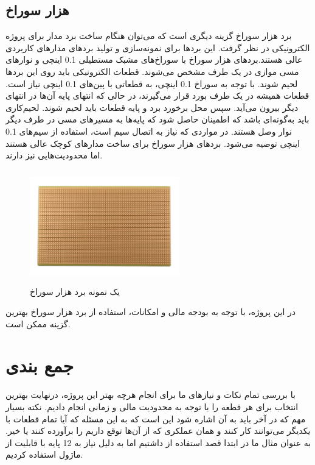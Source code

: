 \subsection{هزار سوراخ}

برد هزار سوراخ‌
\unskip{}
گزینه دیگری است که می‌توان هنگام ساخت برد مدار برای پروژه الکترونیکی در نظر گرفت. این بردها برای نمونه‌سازی و تولید بردهای مدارهای کاربردی عالی هستند.بردهای هزار سوراخ با سوراخ‌های مشبک مستطیلی 0.1 اینچی و نوارهای مسی موازی در یک طرف مشخص می‌شوند. قطعات الکترونیکی باید روی این بردها لحیم شوند. با توجه به سوراخ 0.1 اینچی، به قطعاتی با پین‌های 0.1  اینچی نیاز است. قطعات همیشه در یک طرف بورد قرار می‌گیرند، در حالی که انتهای پایه آ‌ن‌ها در انتهای دیگر بیرون می‌آید. سپس محل برخورد برد و پایه قطعات باید لحیم شوند. لحیم‌کاری باید به‌گونه‌ای باشد که اطمینان حاصل شود که پایه‌ها به مسیرهای مسی در طرف دیگر نوار وصل هستند. در مواردی که نیاز به اتصال سیم است، استفاده از سیم‌های 0.1 اینچی توصیه می‌شود. بردهای هزار سوراخ برای ساخت مدارهای کوچک عالی هستند اما محدودیت‌هایی نیز دارند.

    \begin{figure}[!h]
	\centering
	\includegraphics[height=4.9cm,width=6.5cm]{./Images/CH3/Stripboard.jpg}
	\caption{یک نمونه برد هزار سوراخ}
	\label{برد هزار سوراخ}
	\end{figure} 
	
	در این پروژه، با توجه به بودجه مالی و امکانات، استفاده از برد هزار سوراخ بهترین گزینه ممکن است.

\section{جمع بندی}
با بررسی تمام نکات و نیازهای ما برای انجام هرچه بهتر این پروژه، درنهایت بهترین انتخاب برای هر قطعه را با توجه به محدودیت مالی و زمانی انجام دادیم. نکته بسیار مهم که در آخر باید به آن اشاره شود این است که به این مسئله که آیا تمام قطعات با یکدیگر می‌توانند کار کنند و همان عملکری که از آن‌ها توقع داریم را برآورده کنند یا خیر. به عنوان مثال ما در ابتدا قصد استفاده از  داشتیم اما به دلیل نیاز به 12 پایه با قابلیت  از ماژول  استفاده کردیم.
